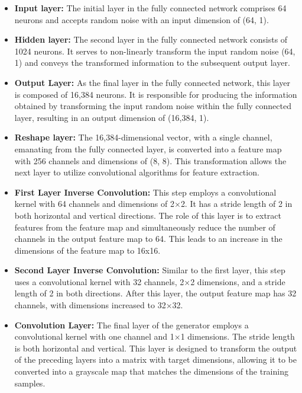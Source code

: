\documentclass[journal]{IEEEtai}
\begin{document}
\begin{itemize}
	\item \textbf{Input layer:} The initial layer in the fully connected network comprises 64 neurons and accepts random noise with an input dimension of (64, 1).

    \item \textbf{Hidden layer:} The second layer in the fully connected network consists of 1024 neurons.
    It serves to non-linearly transform the input random noise (64, 1) and conveys the transformed information to the subsequent output layer.

    \item \textbf{Output Layer:} As the final layer in the fully connected network, this layer is composed of 16,384 neurons. 
    It is responsible for producing the information obtained by transforming the input random noise within the fully connected layer, resulting in an output dimension of (16,384, 1).

    \item \textbf{Reshape layer:} The 16,384-dimensional vector, with a single channel, emanating from the fully connected layer, is converted into a feature map with 256 channels and dimensions of (8, 8). 
    This transformation allows the next layer to utilize convolutional algorithms for feature extraction.

    \item \textbf{First Layer Inverse Convolution:} This step employs a convolutional kernel with 64 channels and dimensions of 2$\times$2. It has a stride length of 2 in both horizontal and vertical directions. 
    The role of this layer is to extract features from the feature map and simultaneously reduce the number of channels in the output feature map to 64. 
    This leads to an increase in the dimensions of the feature map to 16x16.

    \item \textbf{Second Layer Inverse Convolution:} Similar to the first layer, this step uses a convolutional kernel with 32 channels, 2$\times$2 dimensions, and a stride length of 2 in both directions. 
    After this layer, the output feature map has 32 channels, with dimensions increased to 32$\times$32.

    \item \textbf{Convolution Layer:} The final layer of the generator employs a convolutional kernel with one channel and 1$\times$1 dimensions. The stride length is both horizontal and vertical. 
    This layer is designed to transform the output of the preceding layers into a matrix with target dimensions, allowing it to be converted into a grayscale map that matches the dimensions of the training samples.


\end{itemize}
\end{document}
